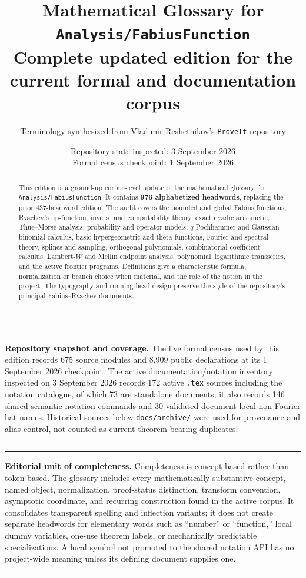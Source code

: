 \documentclass[11pt,oneside]{article}
\title{\bfseries Mathematical Glossary for \texttt{Analysis/FabiusFunction}\\[0.35em]
\large Complete updated edition for the current formal and documentation corpus}
\author{Terminology synthesized from Vladimir Reshetnikov's \texttt{ProveIt} repository}
\date{Repository state inspected: 3 September 2026\\
Formal census checkpoint: 1 September 2026}
\newcommand{\repo}{\nolinkurl{Analysis/FabiusFunction}}
\newenvironment{scopebox}{%
  \par\smallskip\noindent\begin{center}\begin{minipage}{0.94\textwidth}%
  \color{black}\hrule\vspace{0.6em}\small
}{%
  \vspace{0.6em}\hrule\end{minipage}\end{center}\smallskip
}
\begin{document}
\maketitle

\begin{abstract}
This edition is a ground-up corpus-level update of the mathematical glossary for
\repo.  It contains \textbf{976 alphabetized headwords}, replacing the
prior 437-headword edition.  The audit covers the bounded and global Fabius
functions, Rvachev's up-function, inverse and computability theory, exact dyadic
arithmetic, Thue--Morse analysis, probability and operator models,
\(q\)-Pochhammer and Gaussian-binomial calculus, basic hypergeometric and theta
functions, Fourier and spectral theory, splines and sampling, orthogonal
polynomials, combinatorial coefficient calculus, Lambert-\(W\) and Mellin
endpoint analysis, polynomial--logarithmic transseries, and the active frontier
programs.  Definitions give a characteristic formula, normalization or branch
choice when material, and the role of the notion in the project.  The typography
and running-head design preserve the style of the repository's principal
Fabius--Rvachev documents.
\end{abstract}

\begin{scopebox}
\textbf{Repository snapshot and coverage.}
The live formal census used by this edition records 675 source modules and
8,909 public declarations at its 1 September 2026 checkpoint.  The active
documentation/notation inventory inspected on 3 September 2026 records 172
active \texttt{.tex} sources including the notation catalogue, of which 73 are
standalone documents; it also records 146 shared semantic notation commands and
30 validated document-local non-Fourier hat names.  Historical sources below
\texttt{docs/archive/} were used for provenance and alias control, not counted
as current theorem-bearing duplicates.
\end{scopebox}

\begin{scopebox}
\textbf{Editorial unit of completeness.}
Completeness is concept-based rather than token-based.  The glossary includes
every mathematically substantive concept, named object, normalization,
proof-status distinction, transform convention, asymptotic coordinate, and
recurring construction found in the active corpus.  It consolidates transparent
spelling and inflection variants; it does not create separate headwords for
elementary words such as ``number'' or ``function,'' local dummy variables,
one-use theorem labels, or mechanically predictable specializations.  A local
symbol not promoted to the shared notation API has no project-wide meaning
unless its defining document supplies one.
\end{scopebox}
\end{document}
